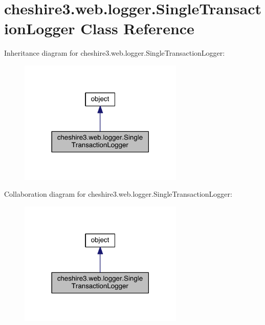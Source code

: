 \hypertarget{classcheshire3_1_1web_1_1logger_1_1_single_transaction_logger}{\section{cheshire3.\-web.\-logger.\-Single\-Transaction\-Logger Class Reference}
\label{classcheshire3_1_1web_1_1logger_1_1_single_transaction_logger}
}


Inheritance diagram for cheshire3.\-web.\-logger.\-Single\-Transaction\-Logger\-:
\nopagebreak
\begin{figure}[H]
\begin{center}
\leavevmode
\includegraphics[width=222pt]{classcheshire3_1_1web_1_1logger_1_1_single_transaction_logger__inherit__graph}
\end{center}
\end{figure}


Collaboration diagram for cheshire3.\-web.\-logger.\-Single\-Transaction\-Logger\-:
\nopagebreak
\begin{figure}[H]
\begin{center}
\leavevmode
\includegraphics[width=222pt]{classcheshire3_1_1web_1_1logger_1_1_single_transaction_logger__coll__graph}
\end{center}
\end{figure}
